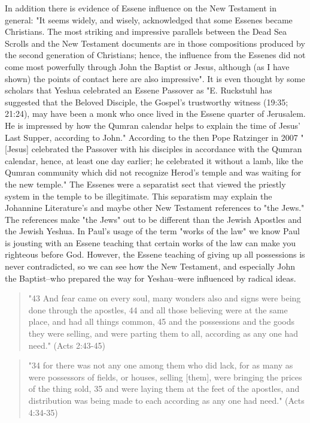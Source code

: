 \documentclass[11pt]{article}
\begin{document}
In addition there is evidence of Essene influence on the New Testament in general: "It seems widely, and wisely, acknowledged that some Essenes became Christians.
The most striking and impressive parallels between the Dead Sea Scrolls and the New Testament documents are in those compositions produced by the second generation of Christians; hence, the influence from the Essenes did not come most powerfully through John the Baptist or Jesus, although (as I have shown) the points of contact here are also impressive".\cite{Exploring the Gospel of John} It is even thought by some scholars that Yeshua celebrated an Essene Passover as "E. Ruckstuhl has suggested that the Beloved Disciple, the Gospel's trustworthy witness (19:35; 21:24), may have been a monk who once lived in the Essene quarter of Jerusalem. He is impressed by how the Qumran calendar helps to explain the time of Jesus' Last Supper, according to John."\cite{Exploring the Gospel of John} According to the then Pope Ratzinger in 2007 "[Jesus] celebrated the Passover with his disciples in accordance with the Qumran calendar, hence, at least one day earlier; he celebrated it without a lamb, like the Qumran community which did not recognize Herod's temple and was waiting for the new temple." \cite{HOMILY OF HIS HOLINESS BENEDICT XVI} The Essenes were a separatist sect that viewed the priestly system in the temple to be illegitimate. This separatism may explain the Johannine Literature's and maybe other New Testament references to "the Jews." The references make "the Jews" out to be different than the Jewish Apostles and the Jewish Yeshua.
In Paul's usage of the term "works of the law" we know Paul is jousting with an Essene teaching that certain works of the law can make you righteous before God.\cite{Paul MMT} However, the Essene teaching of giving up all possessions is never contradicted, so we can see how the New Testament, and especially John the Baptist--who prepared the way for Yeshau--were influenced by radical ideas. 

\begin{quote}
"43 And fear came on every soul, many wonders also and signs were being done through the apostles, 44 and all those believing were at the same place, and had all things common,
45 and the possessions and the goods they were selling, and were parting them to all, according as any one had need." (Acts 2:43-45)
\end{quote}

\begin{quote}
"34 for there was not any one among them who did lack, for as many as were possessors of fields, or houses, selling [them], were bringing the prices of the thing sold,
35 and were laying them at the feet of the apostles, and distribution was being made to each according as any one had need." (Acts 4:34-35)
\end{quote}
\end{document}
